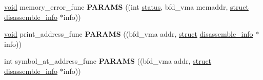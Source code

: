 \begin{DoxyCompactItemize}
\item 
\mbox{\label{structdisassemble__info_a26bdd43c9af4d130eb60ac39fb1ed9db}} 
\hyperlink{interfacevoid}{void} memory\+\_\+error\+\_\+func {\bfseries P\+A\+R\+A\+MS} ((int \hyperlink{structstatus}{status}, bfd\+\_\+vma memaddr, \hyperlink{interfacestruct}{struct} \hyperlink{structdisassemble__info}{disassemble\+\_\+info} $\ast$info))
\item 
\mbox{\label{structdisassemble__info_a4e5401192e35362d428b4166b3d97e0e}} 
\hyperlink{interfacevoid}{void} print\+\_\+address\+\_\+func {\bfseries P\+A\+R\+A\+MS} ((bfd\+\_\+vma addr, \hyperlink{interfacestruct}{struct} \hyperlink{structdisassemble__info}{disassemble\+\_\+info} $\ast$info))
\item 
\mbox{\label{structdisassemble__info_ae0b0a089e489361f848cdeda2e1863e2}} 
int symbol\+\_\+at\+\_\+address\+\_\+func {\bfseries P\+A\+R\+A\+MS} ((bfd\+\_\+vma addr, \hyperlink{interfacestruct}{struct} \hyperlink{structdisassemble__info}{disassemble\+\_\+info} $\ast$info))
\end{DoxyCompactItemize}
